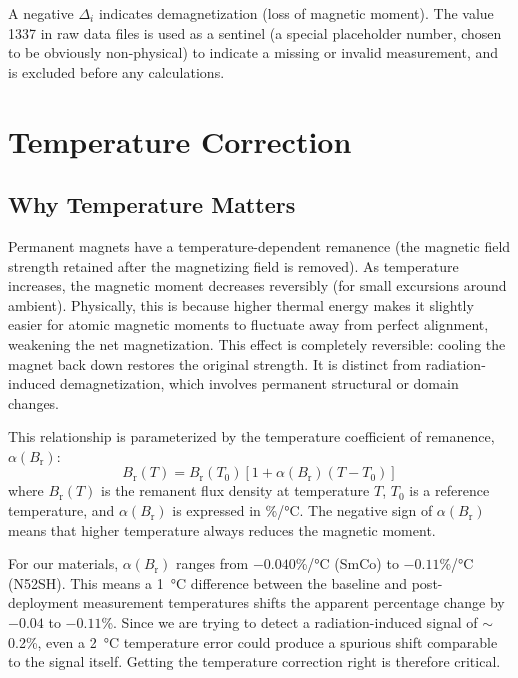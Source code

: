 \documentclass[11pt,letterpaper]{article}
\newcommand{\smco}{SmCo}
\newcommand{\Br}{B_\mathrm{r}}
\newcommand{\alphar}{\alpha(\Br)}
\begin{document}
A negative $\Delta_i$ indicates demagnetization (loss of magnetic
moment). The value 1337 in raw data files is used as a sentinel (a special
placeholder number, chosen to be obviously non-physical) to indicate a missing
or invalid measurement, and is excluded before any calculations.

\section{Temperature Correction}
\label{sec:temperature}

\subsection{Why Temperature Matters}

Permanent magnets have a temperature-dependent remanence (the magnetic field
strength retained after the magnetizing field is removed). As temperature
increases, the magnetic moment decreases reversibly (for small excursions
around ambient). Physically, this is because higher thermal energy makes it
slightly easier for atomic magnetic moments to fluctuate away from perfect
alignment, weakening the net magnetization. This effect is completely
reversible: cooling the magnet back down restores the original strength. It is
distinct from radiation-induced demagnetization, which involves permanent
structural or domain changes.

This relationship is parameterized by the temperature coefficient of
remanence, $\alphar$:
\begin{equation}
    \Br(T) = \Br(T_0) \left[ 1 + \alphar (T - T_0) \right]
\end{equation}
where $\Br(T)$ is the remanent flux density at temperature $T$, $T_0$ is a
reference temperature, and $\alphar$ is expressed in \%/\si{\celsius}. The
negative sign of $\alphar$ means that higher temperature always reduces the
magnetic moment.

For our materials, $\alphar$ ranges from $-0.040$\%/\si{\celsius} (\smco{})
to $-0.11$\%/\si{\celsius} (N52SH). This means a \SI{1}{\celsius} difference
between the baseline and post-deployment measurement temperatures shifts the
apparent percentage change by $-0.04$ to $-0.11$\%. Since we are trying to
detect a radiation-induced signal of $\sim$0.2\%, even a \SI{2}{\celsius}
temperature error could produce a spurious shift comparable to the signal
itself. Getting the temperature correction right is therefore critical.
\end{document}
